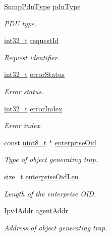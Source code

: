 \begin{DoxyCompactItemize}
\hyperlink{snmp__common_8h_a3c16ad3ed681ee8a30c429d490f9299a}{Snmp\+Pdu\+Type} \hyperlink{structSnmpMessage_a48ced2a20c11fcd5c72fa1c47d239343}{pdu\+Type}
\begin{DoxyCompactList}\small\item\em P\+DU type. \end{DoxyCompactList}\item 
\hyperlink{stdint_8h_ab1967d8591af1a4e48c37fd2b0f184d0}{int32\+\_\+t} \hyperlink{structSnmpMessage_a53c30d2eaaf117a457bfd3211071540b}{request\+Id}
\begin{DoxyCompactList}\small\item\em Request identifier. \end{DoxyCompactList}\item 
\hyperlink{stdint_8h_ab1967d8591af1a4e48c37fd2b0f184d0}{int32\+\_\+t} \hyperlink{structSnmpMessage_afb6f5e5cf7da54678aff6c79dd5948ce}{error\+Status}
\begin{DoxyCompactList}\small\item\em Error status. \end{DoxyCompactList}\item 
\hyperlink{stdint_8h_ab1967d8591af1a4e48c37fd2b0f184d0}{int32\+\_\+t} \hyperlink{structSnmpMessage_a6be5f10373d70dd0972a43a24299a8f7}{error\+Index}
\begin{DoxyCompactList}\small\item\em Error index. \end{DoxyCompactList}\item 
const \hyperlink{stdint_8h_aba7bc1797add20fe3efdf37ced1182c5}{uint8\+\_\+t} $\ast$ \hyperlink{structSnmpMessage_a807a5b8b2aaf91ba7ad7c5130f7de5fe}{enterprise\+Oid}
\begin{DoxyCompactList}\small\item\em Type of object generating trap. \end{DoxyCompactList}\item 
size\+\_\+t \hyperlink{structSnmpMessage_a70d5dc7f03456b144b0d29a6a30b0a21}{enterprise\+Oid\+Len}
\begin{DoxyCompactList}\small\item\em Length of the enterprise O\+ID. \end{DoxyCompactList}\item 
\hyperlink{ipv4_8h_a411debb3d770caa0c06d3f73367da37f}{Ipv4\+Addr} \hyperlink{structSnmpMessage_a3c51309a93e0740209c2ee75307c0f04}{agent\+Addr}
\begin{DoxyCompactList}\small\item\em Address of object generating trap. \end{DoxyCompactList}\item 

\end{DoxyCompactItemize}
